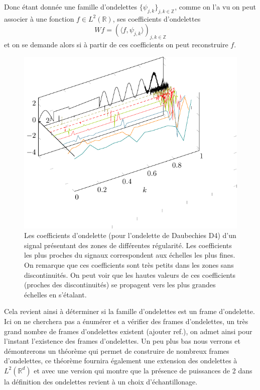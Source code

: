 Donc étant donnée une famille d'ondelettes $\{\psi_{j,k}\}_{j,k \in \mathbb{Z}}$, comme on l'a vu on peut associer à une fonction $f\in L^2(\mathbb{R})$, ses coefficients d'ondelettes
\begin{equation}
	Wf = (\langle f, \psi_{j,k} \rangle )_{j,k \in \mathbb{Z}}
\end{equation}
et on se demande alors si à partir de ces coefficients on peut reconstruire $f$.
\begin{figure}[h]
	\includegraphics{Figs/wavelet}
	\caption{Les coefficients d'ondelette (pour l'ondelette de Daubechies D4) d'un signal présentant des zones de différentes régularité. Les coefficients les plus proches du signaux correspondent aux échelles les plus fines. On remarque que ces coefficients sont très petits dans les zones sans discontinuités. On peut voir que les hautes valeurs de ces coefficients (proches des discontinuités) se propagent vers les plus grandes échelles en s'étalant.}
\end{figure}
Cela revient ainsi à déterminer si la famille d'ondelettes est un frame d'ondelette. 
Ici on ne cherchera pas a énumérer et a vérifier des frames d'ondelettes, un très grand nombre de frames d'ondelettes existent (ajouter ref.), on admet ainsi pour l'instant l'existence des frames d'ondelettes.
Un peu plus bas nous verrons et démontrerons un théorème qui permet de construire de nombreux frames d'ondelettes, ce théorème fournira également une extension des ondelettes à $L^2(\mathbb{R}^d)$ et avec une version qui montre que la présence de puissances de 2 dans la définition des ondelettes revient à un choix d'échantillonage. 
